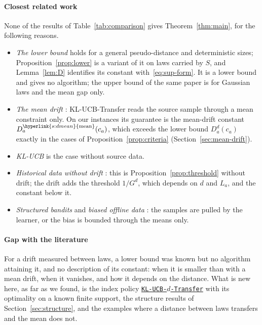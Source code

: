 \documentclass[11pt]{article}
\newcommand{\sy}[2]{{\hyperlink{#1}{#2}}}
\newcommand{\dmean}{\sy{s:dmean}{\mathrm{mean}}}
\newcommand{\Alg}{\hyperref[alg:index]{\texttt{KL-UCB-$d$-Transfer}}}
\begin{document}
\paragraph{Closest related work} None of the results of Table~\ref{tab:comparison} gives
Theorem~\ref{thm:main}, for the following reasons.
\begin{itemize}
\item \emph{The lower bound} \citep[Theorem~3]{PMM25} holds for a general pseudo-distance and
  deterministic sizes; Proposition~\ref{prop:lower} is a variant of it on laws carried by $S$, and
  Lemma~\ref{lem:D} identifies its constant with~\eqref{eq:sup-form}. It is a lower bound and gives
  no algorithm; the upper bound of the same paper \citep[Theorem~6]{PMM25} is for Gaussian laws and
  the mean gap only.
\item \emph{The mean drift} \citep{PMRM26}: KL-UCB-Transfer reads the source sample through a mean
  constraint only. On our instances its guarantee is the mean-drift constant
  $D^{\dmean}_a(c_a)$, which exceeds the lower bound $D^d_a(c_a)$ exactly in the cases of
  Proposition~\ref{prop:criteria} (Section~\ref{sec:mean-drift}).
\item \emph{KL-UCB} \citep{CGMMS13} is the case without source data.
\item \emph{Historical data without drift} \citep{SJ12}: this is Proposition~\ref{prop:threshold}
  without drift; the drift adds the threshold $1/G^d$, which depends on $d$ and $L_a$, and the
  constant below it.
\item \emph{Structured bandits} \citep{MCP14,CMP17} and \emph{biased offline data}
  \citep{CL24,LFCK26}: the samples are pulled by the learner, or the bias is bounded through the
  means only.
\end{itemize}

\paragraph{Gap with the literature} For a drift measured between laws, a lower bound was known
\citep[Theorem~3]{PMM25} but no algorithm attaining it, and no description of its constant: when it
is smaller than with a mean drift, when it vanishes, and how it depends on the distance. What is new
here, as far as we found, is the index policy \Alg{} with its optimality on a known finite support,
the structure results of Section~\ref{sec:structure}, and the examples where a distance between laws
transfers and the mean does not.
\end{document}
